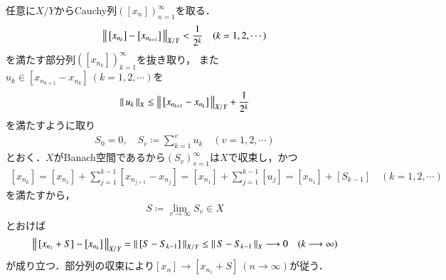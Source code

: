 	\begin{prf}
		任意に$X/Y$からCauchy列$\left( [x_n] \right)_{n=1}^{\infty}$を取る．
		\begin{align}
			\left\|\, \left[ x_{n_k} \right] - \left[ x_{n_{k+1}} \right]\, \right\|_{X/Y} < \frac{1}{2^k} \quad (k=1,2,\cdots)
		\end{align}
		を満たす部分列$\left( [x_{n_k}] \right)_{k=1}^{\infty}$を抜き取り，
		また$u_k \in \left[ x_{n_{k+1}} - x_{n_k} \right]\ (k=1,2,\cdots)$を
		\begin{align}
			\left\|\, u_k\, \right\|_{X} \leq \left\|\, \left[ x_{n_{k+1}} - x_{n_k} \right]\, \right\|_{X/Y} + \frac{1}{2^k}
		\end{align}
		を満たすように取り
		\begin{align}
			S_0 = 0, \quad S_v \coloneqq \sum_{k=1}^{v} u_k \quad (v=1,2,\cdots)
		\end{align}
		とおく．$X$がBanach空間であるから$(S_v)_{v=1}^{\infty}$は$X$で収束し，かつ
		\begin{align}
			\left[ x_{n_k} \right] = [x_{n_1}] + \sum_{j=1}^{k-1} \left[ x_{n_{j+1}}  - x_{n_j} \right]
				= [x_{n_1}] + \sum_{j=1}^{k-1} [u_j]
				= [x_{n_1}] + \left[ S_{k-1} \right]
				\quad (k=1,2,\cdots)
		\end{align}
		を満たすから，
		\begin{align}
			S \coloneqq \lim_{v \to \infty} S_v \in X
		\end{align}
		とおけば
		\begin{align}
			\left\|\, [x_{n_1} + S] - \left[ x_{n_k} \right]\, \right\|_{X/Y}
			= \left\|\, \left[ S - S_{k-1} \right]\, \right\|_{X/Y}
			\leq \left\|\, S - S_{k-1}\, \right\|_{X}
			\longrightarrow 0 \quad (k \longrightarrow \infty)
		\end{align}
		が成り立つ．部分列の収束により$[x_n] \longrightarrow [x_{n_1} + S]\ (n \longrightarrow \infty)$が従う．
		\QED
	\end{prf}